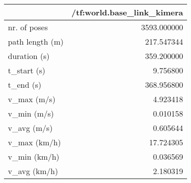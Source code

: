 \begin{tabular}{lr}
\toprule
{} &  /tf:world.base\_link\_kimera \\
\midrule
nr. of poses    &                 3593.000000 \\
path length (m) &                  217.547344 \\
duration (s)    &                  359.200000 \\
t\_start (s)     &                    9.756800 \\
t\_end (s)       &                  368.956800 \\
v\_max (m/s)     &                    4.923418 \\
v\_min (m/s)     &                    0.010158 \\
v\_avg (m/s)     &                    0.605644 \\
v\_max (km/h)    &                   17.724305 \\
v\_min (km/h)    &                    0.036569 \\
v\_avg (km/h)    &                    2.180319 \\
\bottomrule
\end{tabular}
